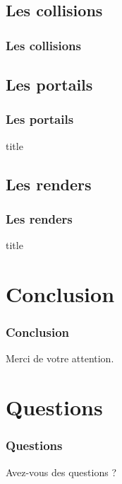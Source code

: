 \documentclass{beamer}
\begin{document}
\subsection{Les collisions}

\begin{frame}
    \frametitle{Les collisions}
    \begin{block}{}
    \end{block}
\end{frame}

\subsection{Les portails}

\begin{frame}
    \frametitle{Les portails}
    \begin{block}{title}
        
    \end{block}
\end{frame}

\subsection{Les renders}

\begin{frame}
    \frametitle{Les renders}
    \begin{block}{title}
        
    \end{block}
\end{frame}

\section{Conclusion}

\begin{frame}
    \frametitle{Conclusion}
    \begin{block}{}
        \centering
        Merci de votre attention.
    \end{block}
\end{frame}

\section*{Questions}

\begin{frame}
    \frametitle{Questions}
    \begin{block}{}
        \centering
        Avez-vous des questions ?
    \end{block}
\end{frame}
\end{document}
